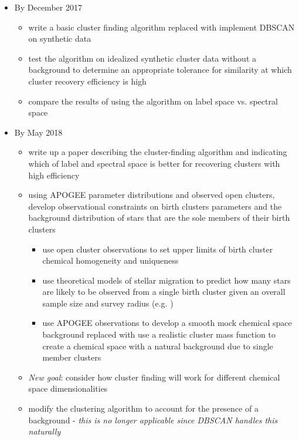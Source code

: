 \documentclass[11pt]{article}
\begin{document}
\begin{itemize}

\item By December 2017
\begin{itemize} 
\item {\color{BurntOrange} write a basic cluster finding algorithm} replaced with {\color{RoyalBlue} implement DBSCAN on synthetic data}
\item {\color{RoyalBlue} test the algorithm on idealized synthetic cluster data without a background to determine an appropriate tolerance for similarity at which cluster recovery efficiency is high}
\item {\color{RoyalBlue} compare the results of using the algorithm on label space vs. spectral space}
\end{itemize}
\item By May 2018
\begin{itemize}
\item {\color{ForestGreen} write up a paper describing the cluster-finding algorithm and indicating which of label and spectral space is better for recovering clusters with high efficiency}
\item {\color{RoyalBlue}using APOGEE parameter distributions and observed open clusters, develop observational constraints on birth clusters parameters and the background distribution of stars that are the sole members of their birth clusters}
\begin{itemize}
\item {\color{ForestGreen} use open cluster observations to set upper limits of birth cluster chemical homogeneity and uniqueness}
\item use theoretical models of stellar migration to predict how many stars are likely to be observed from a single birth cluster given an overall sample size and survey radius (e.g. \citealt{Ting2015})
\item {\color{BurntOrange} use APOGEE observations to develop a smooth mock chemical space background} replaced with {\color{RoyalBlue} use a realistic cluster mass function to create a chemical space with a natural background due to single member clusters}
\end{itemize}
\item \emph{New goal}: {\color{ForestGreen} consider how cluster finding will work for different chemical space dimensionalities}
\item {\color{BurntOrange} modify the clustering algorithm to account for the presence of a background} - \emph{this is no longer applicable since DBSCAN handles this naturally}

\end{itemize}
\end{itemize}
\end{document}
